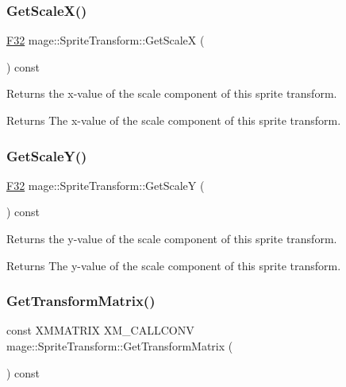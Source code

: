 \subsubsection{\texorpdfstring{Get\+Scale\+X()}{GetScaleX()}}
{\footnotesize\ttfamily \hyperlink{namespacemage_aa97e833b45f06d60a0a9c4fc22ae02c0}{F32} mage\+::\+Sprite\+Transform\+::\+Get\+ScaleX (\begin{DoxyParamCaption}{ }\end{DoxyParamCaption}) const\hspace{0.3cm}{\ttfamily [noexcept]}}

Returns the x-\/value of the scale component of this sprite transform.

\begin{DoxyReturn}{Returns}
The x-\/value of the scale component of this sprite transform. 
\end{DoxyReturn}
\hypertarget{classmage_1_1_sprite_transform_a07010f5d7e781ca641456b18fd16e67f}{}\label{classmage_1_1_sprite_transform_a07010f5d7e781ca641456b18fd16e67f} 
\subsubsection{\texorpdfstring{Get\+Scale\+Y()}{GetScaleY()}}
{\footnotesize\ttfamily \hyperlink{namespacemage_aa97e833b45f06d60a0a9c4fc22ae02c0}{F32} mage\+::\+Sprite\+Transform\+::\+Get\+ScaleY (\begin{DoxyParamCaption}{ }\end{DoxyParamCaption}) const\hspace{0.3cm}{\ttfamily [noexcept]}}

Returns the y-\/value of the scale component of this sprite transform.

\begin{DoxyReturn}{Returns}
The y-\/value of the scale component of this sprite transform. 
\end{DoxyReturn}
\hypertarget{classmage_1_1_sprite_transform_ac9d30bb4a52ababcdee4514aac7f7402}{}\label{classmage_1_1_sprite_transform_ac9d30bb4a52ababcdee4514aac7f7402} 
\subsubsection{\texorpdfstring{Get\+Transform\+Matrix()}{GetTransformMatrix()}}
{\footnotesize\ttfamily const X\+M\+M\+A\+T\+R\+IX X\+M\+\_\+\+C\+A\+L\+L\+C\+O\+NV mage\+::\+Sprite\+Transform\+::\+Get\+Transform\+Matrix (\begin{DoxyParamCaption}{ }\end{DoxyParamCaption}) const\hspace{0.3cm}{\ttfamily [noexcept]}}

